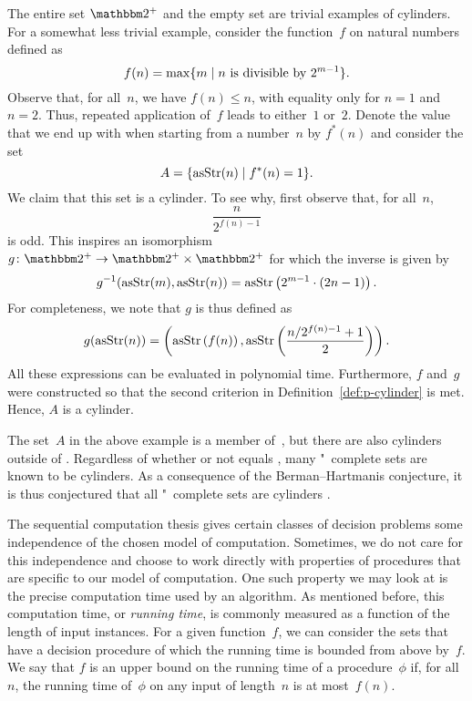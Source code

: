 \begin{example}
  The entire set $\binary^+$ and the empty set are trivial examples of \pdash{}cylinders.
  For a somewhat less trivial example, consider the function~$f$ on natural numbers defined as
  \begin{equation*}
    f(n) = \max \{m \;|\; \text{$n$ is divisible by $2^{m-1}$}\}.
  \end{equation*}
  Observe that, for all~$n$, we have $f(n) \le n$, with equality only for $n = 1$ and $n = 2$.
  Thus, repeated application of~$f$ leads to either~$1$ or~$2$.
  Denote the value that we end up with when starting from a number~$n$ by $f^*(n)$ and consider the set
  \begin{equation*}
    A = \{\operatorname{asStr}(n) \;|\; f^*(n) = 1\}.
  \end{equation*}
  We claim that this set is a \pdash{}cylinder.
  To see why, first observe that, for all~$n$,
  \begin{equation*}
    \frac{n}{2^{f(n) - 1}}
  \end{equation*}
  is odd.
  This inspires an isomorphism $g\colon \binary^+ \to \binary^+ \times \binary^+$ for which the inverse is given by
  \begin{equation*}
    g^{-1}(\operatorname{asStr}(m), \operatorname{asStr}(n)) = \operatorname{asStr}\left(2^{m - 1} \cdot (2 n - 1)\right).
  \end{equation*}
  For completeness, we note that $g$ is thus defined as
  \begin{equation*}
    g(\operatorname{asStr}(n)) = \left(\operatorname{asStr}\left(f(n)\right),\operatorname{asStr}\left(\frac{n / 2^{f(n) - 1} + 1}{2}\right)\right).
  \end{equation*}
  All these expressions can be evaluated in polynomial time.
  Furthermore, $f$ and~$g$ were constructed so that the second criterion in Definition~\ref{def:p-cylinder} is met.
  Hence, $A$ is a \pdash{}cylinder.
\end{example}

The set~$A$ in the above example is a member of~, but there are also \pdash{}cylinders outside of  \parencite{allender1988isomorphisms}.
Regardless of whether or not  equals , many "~complete sets are known to be \pdash{}cylinders.
As a consequence of the Berman--Hartmanis conjecture, it is thus conjectured that all "~complete sets are \pdash{}cylinders \parencite[see also][]{hemachandra1991sets}.

The sequential computation thesis gives certain classes of decision problems some independence of the chosen model of computation.
Sometimes, we do not care for this independence and choose to work directly with properties of procedures that are specific to our model of computation.
One such property we may look at is the precise computation time used by an algorithm.
As mentioned before, this computation time, or \emph{running time}, is commonly measured as a function of the length of input instances.
For a given function~$f$, we can consider the sets that have a decision procedure of which the running time is bounded from above by~$f$.
We say that $f$ is an upper bound on the running time of a procedure~$\phi$ if, for all~$n$, the running time of~$\phi$ on any input of length~$n$ is at most~$f(n)$.


